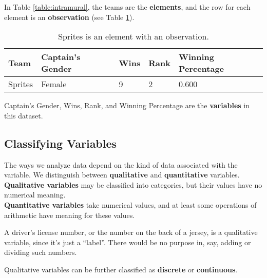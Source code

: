 \documentclass[12pt,openany]{book}
\begin{document}
	\noindent In Table \ref{table:intramural}, the teams are the \textbf{elements}, and the row for each element is an \textbf{observation} (see Table \ref{table:observation}).\\

	\begin{table}[h!]
		\begin{center}
			\begin{tabular}{| l | l | l | l | l |}
				\hline
				\textbf{Team} & \textbf{Captain's Gender} & \textbf{Wins} & \textbf{Rank} & \textbf{Winning Percentage} \\
				\hline
				Sprites & Female & 9 & 2 & 0.600 \\
				\hline
			\end{tabular}
		\end{center}
		\caption{Sprites is an element with an observation.}
		\label{table:observation}
	\end{table}

	\noindent Captain's Gender, Wins, Rank, and Winning Percentage are the \textbf{variables} in this dataset.

	\subsection{Classifying Variables}

	The ways we analyze data depend on the kind of data associated with the variable. We distinguish between \textbf{qualitative} and \textbf{quantitative} variables.\\

	\noindent \textbf{Qualitative variables} may be classified into categories, but their values have no numerical meaning.\\

	\noindent \textbf{Quantitative variables} take numerical values, and at least some operations of arithmetic have meaning for these values.

	\begin{tcolorbox}[width=\textwidth,colback={blue!10},title={\textbf{Not all numbers are quantitative.}},colbacktitle={blue!10},coltitle=black]
		A driver's license number, or the number on the back of a jersey, is a qualitative variable, since it's just a ``label''. There would be no purpose in, say, adding or dividing such numbers.
	\end{tcolorbox}

	\noindent Qualitative variables can be further classified as \textbf{discrete} or \textbf{continuous}.\\
\end{document}
